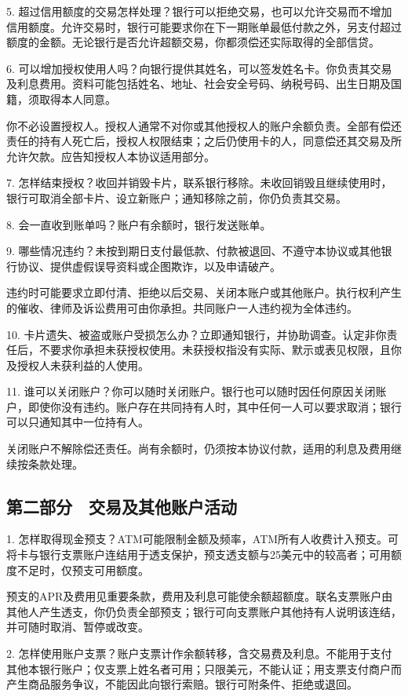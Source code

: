 \documentclass[UTF8,fontset=none,11pt,a4paper]{ctexart}
\begin{document}
5. 超过信用额度的交易怎样处理？银行可以拒绝交易，也可以允许交易而不增加信用额度。允许交易时，银行可能要求你在下一期账单最低付款之外，另支付超过额度的金额。无论银行是否允许超额交易，你都须偿还实际取得的全部信贷。


6. 可以增加授权使用人吗？向银行提供其姓名，可以签发姓名卡。你负责其交易及利息费用。资料可能包括姓名、地址、社会安全号码、纳税号码、出生日期及国籍，须取得本人同意。


你不必设置授权人。授权人通常不对你或其他授权人的账户余额负责。全部有偿还责任的持有人死亡后，授权人权限结束；之后仍使用卡的人，同意偿还其交易及所允许欠款。应告知授权人本协议适用部分。


7. 怎样结束授权？收回并销毁卡片，联系银行移除。未收回销毁且继续使用时，银行可取消全部卡片、设立新账户；通知移除之前，你仍负责其交易。


8. 会一直收到账单吗？账户有余额时，银行发送账单。


9. 哪些情况违约？未按到期日支付最低款、付款被退回、不遵守本协议或其他银行协议、提供虚假误导资料或企图欺诈，以及申请破产。


违约时可能要求立即付清、拒绝以后交易、关闭本账户或其他账户。执行权利产生的催收、律师及诉讼费用可由你承担。共同账户一人违约视为全体违约。


10. 卡片遗失、被盗或账户受损怎么办？立即通知银行，并协助调查。认定非你责任后，不要求你承担未获授权使用。未获授权指没有实际、默示或表见权限，且你及授权人未获利益的人使用。


11. 谁可以关闭账户？你可以随时关闭账户。银行也可以随时因任何原因关闭账户，即使你没有违约。账户存在共同持有人时，其中任何一人可以要求取消；银行可以只通知其中一位持有人。


关闭账户不解除偿还责任。尚有余额时，仍须按本协议付款，适用的利息及费用继续按条款处理。


\subsection*{第二部分　交易及其他账户活动}
1. 怎样取得现金预支？ATM可能限制金额及频率，ATM所有人收费计入预支。可将卡与银行支票账户连结用于透支保护，预支透支额与25美元中的较高者；可用额度不足时，仅预支可用额度。


预支的APR及费用见重要条款，费用及利息可能使余额超额度。联名支票账户由其他人产生透支，你仍负责全部预支；银行可向支票账户其他持有人说明该连结，并可随时取消、暂停或改变。


2. 怎样使用账户支票？账户支票计作余额转移，含交易费及利息。不能用于支付其他本银行账户；仅支票上姓名者可用；只限美元，不能认证；用支票支付商户而产生商品服务争议，不能因此向银行索赔。银行可附条件、拒绝或退回。
\end{document}
